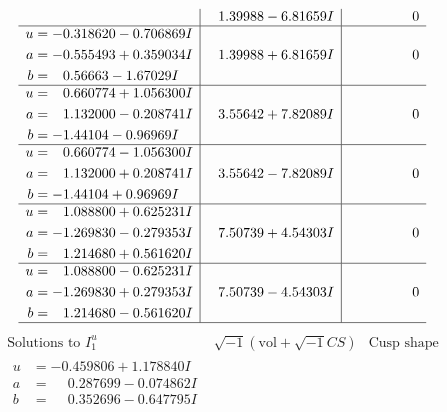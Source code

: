 \documentclass[1p]{elsarticle_modified}
\theoremstyle{definition}
\newcommand{\I}{\sqrt{-1}}
\begin{document}
$$\begin{array}{c|c|c}
 & \phantom{-}1.39988 - 6.81659 I & \phantom{-0.000000 } 0 \\ \hline\begin{aligned}
u &= -0.318620 - 0.706869 I \\
a &= -0.555493 + 0.359034 I \\
b &= \phantom{-}0.56663 - 1.67029 I\end{aligned}
 & \phantom{-}1.39988 + 6.81659 I & \phantom{-0.000000 } 0 \\ \hline\begin{aligned}
u &= \phantom{-}0.660774 + 1.056300 I \\
a &= \phantom{-}1.132000 - 0.208741 I \\
b &= -1.44104 - 0.96969 I\end{aligned}
 & \phantom{-}3.55642 + 7.82089 I & \phantom{-0.000000 } 0 \\ \hline\begin{aligned}
u &= \phantom{-}0.660774 - 1.056300 I \\
a &= \phantom{-}1.132000 + 0.208741 I \\
b &= -1.44104 + 0.96969 I\end{aligned}
 & \phantom{-}3.55642 - 7.82089 I & \phantom{-0.000000 } 0 \\ \hline\begin{aligned}
u &= \phantom{-}1.088800 + 0.625231 I \\
a &= -1.269830 - 0.279353 I \\
b &= \phantom{-}1.214680 + 0.561620 I\end{aligned}
 & \phantom{-}7.50739 + 4.54303 I & \phantom{-0.000000 } 0 \\ \hline\begin{aligned}
u &= \phantom{-}1.088800 - 0.625231 I \\
a &= -1.269830 + 0.279353 I \\
b &= \phantom{-}1.214680 - 0.561620 I\end{aligned}
 & \phantom{-}7.50739 - 4.54303 I & \phantom{-0.000000 } 0\\
 \hline 
 \end{array}$$\newpage$$\begin{array}{c|c|c}  
\text{Solutions to }I^u_{1}& \I (\text{vol} + \sqrt{-1}CS) & \text{Cusp shape}\\
 \hline 
\begin{aligned}
u &= -0.459806 + 1.178840 I \\
a &= \phantom{-}0.287699 - 0.074862 I \\
b &= \phantom{-}0.352696 - 0.647795 I\end{aligned}

\end{array}$$
\end{document}
